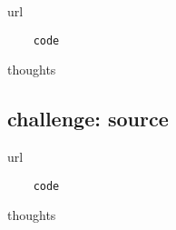 \documentclass[
	letterpaper, %
	12pt, %
]{CSSullivanBusinessReport}
\begin{document}
url

\begin{verbatim}
	code
\end{verbatim}

thoughts


\subsection[Challenge]{challenge: source}

url

\begin{verbatim}
	code
\end{verbatim}

thoughts


\newpage


\begin{twothirdswidth} %
	\printbibliography[title=Reference List] %
\end{twothirdswidth}






\end{document}
